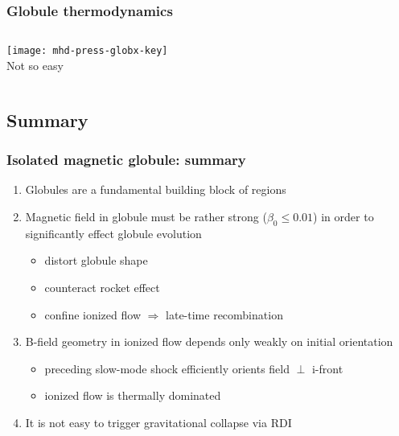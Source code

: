 \documentclass[presentation]{beamer}
\begin{document}
\begin{frame}
  \frametitle{Globule thermodynamics}\smallskip
  \color{red!50!orange!70!black}
  \begin{columns}
  \texttt{[image: mhd-press-globx-key]}
    \\ \medskip
    Not so easy
    \vspace*{3\baselineskip}
  \end{columns}
\end{frame}

\subsection{Summary}


\begin{frame}
  \frametitle{Isolated magnetic globule: summary}
  \linespread{1.3}\selectfont
  \begin{enumerate}
  \item Globules are a fundamental building block of \hii{} regions
  \item Magnetic field in globule must be rather strong ($\beta_0 \le
    0.01$) in order to significantly effect globule evolution
    \begin{itemize}
    \item distort globule shape
    \item counteract rocket effect
    \item confine ionized flow $\Rightarrow$ late-time recombination
    \end{itemize}
  \item B-field geometry in ionized flow depends only weakly on
    initial orientation
    \begin{itemize}
    \item preceding slow-mode shock efficiently orients field $\perp$ i-front
    \item ionized flow is thermally dominated
    \end{itemize}
  \item It is not easy to trigger gravitational collapse via RDI
  \end{enumerate}
\end{frame}
\end{document}
